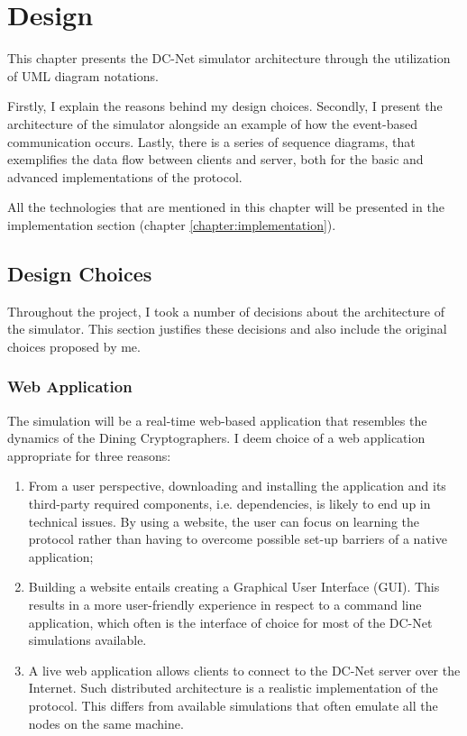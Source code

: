 \chapter{Design} \label{chapter:design}
This chapter presents the DC-Net simulator architecture through the utilization of UML diagram notations.

Firstly, I explain the reasons behind my design choices. Secondly, I present the architecture of the simulator alongside an example of how the event-based communication occurs. Lastly, there is a series of sequence diagrams, that exemplifies the data flow between clients and server, both for the basic and advanced implementations of the protocol.

All the technologies that are mentioned in this chapter will be presented in the implementation section (chapter \ref{chapter:implementation}).


\section{Design Choices}
Throughout the project, I took a number of decisions about the architecture of the simulator. This section justifies these decisions and also include the original choices proposed by me. 

\subsection{Web Application}
The simulation will be a real-time web-based application that resembles the dynamics of the Dining Cryptographers. I deem choice of a web application appropriate for three reasons:
\begin{enumerate}
    \item From a user perspective, downloading and installing the application and its third-party required components, i.e. dependencies, is likely to end up in technical issues. By using a website, the user can focus on learning the protocol rather than having to overcome possible set-up barriers of a native application;
    \item Building a website entails creating a Graphical User Interface (GUI). This results in a more user-friendly experience in respect to a command line application, which often is the interface of choice for most of the DC-Net simulations available.
    \item A live web application allows clients to connect to the DC-Net server over the Internet. Such distributed architecture is a realistic implementation of the protocol. This differs from available simulations that often emulate all the nodes on the same machine.
\end{enumerate}

